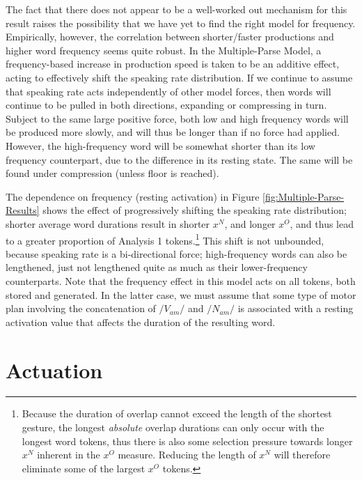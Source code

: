 The fact that there does not appear to be a well-worked out mechanism
for this result raises the possibility that we have yet to find the
right model for frequency. Empirically, however, the correlation between
shorter/faster productions and higher word frequency seems quite robust.
In the Multiple-Parse Model, a frequency-based increase in production
speed is taken to be an additive effect, acting to effectively shift
the speaking rate distribution. If we continue to assume that speaking
rate acts independently of other model forces, then words will continue
to be pulled in both directions, expanding or compressing in turn.
Subject to the same large positive force, both low and high frequency
words will be produced more slowly, and will thus be longer than if
no force had applied. However, the high-frequency word will be somewhat
shorter than its low frequency counterpart, due to the difference
in its resting state. The same will be found under compression (unless
floor is reached).

The dependence on frequency (resting activation) in Figure \ref{fig:Multiple-Parse-Results}
shows the effect of progressively shifting the speaking rate distribution;
shorter average word durations result in shorter $x^{N}$, and longer
$x^{O}$, and thus lead to a greater proportion of Analysis 1 tokens.\footnote{Because the duration of overlap cannot exceed the length of the shortest
gesture, the longest \emph{absolute} overlap durations can only occur
with the longest word tokens, thus there is also some selection pressure
towards longer $x^{N}$ inherent in the $x^{O}$ measure. Reducing
the length of $x^{N}$ will therefore eliminate some of the largest
$x^{O}$ tokens.} This shift is not unbounded, because speaking rate is a bi-directional
force; high-frequency words can also be lengthened, just not lengthened
quite as much as their lower-frequency counterparts. Note that the
frequency effect in this model acts on all tokens, both stored and
generated. In the latter case, we must assume that some type of motor
plan involving the concatenation of $/V_{am}/$ and $/N_{am}/$ is
associated with a resting activation value that affects the duration
of the resulting word. 

\section{Actuation}

